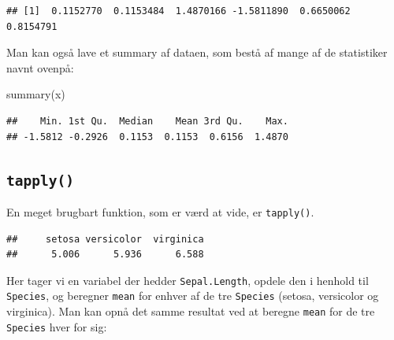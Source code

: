\documentclass[
]{book}
\newenvironment{Shaded}{\begin{snugshade}}{\end{snugshade}}
\newcommand{\CommentTok}[1]{\textcolor[rgb]{0.56,0.35,0.01}{\textit{#1}}}
\newcommand{\FunctionTok}[1]{\textcolor[rgb]{0.00,0.00,0.00}{#1}}
\newcommand{\NormalTok}[1]{#1}
\newcommand{\SpecialCharTok}[1]{\textcolor[rgb]{0.00,0.00,0.00}{#1}}
\begin{document}
\begin{verbatim}
## [1]  0.1152770  0.1153484  1.4870166 -1.5811890  0.6650062  0.8154791
\end{verbatim}

Man kan også lave et summary af dataen, som bestå af mange af de statistiker navnt ovenpå:

\begin{Shaded}
\begin{Highlighting}[]
\FunctionTok{summary}\NormalTok{(x)}
\end{Highlighting}
\end{Shaded}

\begin{verbatim}
##    Min. 1st Qu.  Median    Mean 3rd Qu.    Max. 
## -1.5812 -0.2926  0.1153  0.1153  0.6156  1.4870
\end{verbatim}

\hypertarget{tapply}{%
\subsection{\texorpdfstring{\texttt{tapply()}}{tapply()}}\label{tapply}}

En meget brugbart funktion, som er værd at vide, er \texttt{tapply()}.

\begin{Shaded}
\end{Shaded}

\begin{verbatim}
##     setosa versicolor  virginica 
##      5.006      5.936      6.588
\end{verbatim}

Her tager vi en variabel der hedder \texttt{Sepal.Length}, opdele den i henhold til \texttt{Species}, og beregner \texttt{mean} for enhver af de tre \texttt{Species} (setosa, versicolor og virginica). Man kan opnå det samme resultat ved at beregne \texttt{mean} for de tre \texttt{Species} hver for sig:
\end{document}
